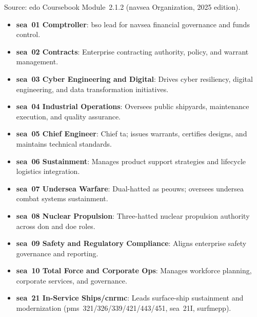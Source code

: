\documentclass[../main.tex]{subfiles}
\begin{document}
\begin{description}[style=nextline, labelsep=0.5em, font=\bfseries]
  \item[\textbf{\ac{navsea} headquarters roles.}]
        Source: \ac{edo} Coursebook Module~2.1.2 (\ac{navsea} Organization, 2025 edition).
        \begin{itemize}
          \item \textbf{\ac{sea}~01 Comptroller}: \ac{bso} lead for \ac{navsea} financial governance and funds control.
          \item \textbf{\ac{sea}~02 Contracts}: Enterprise contracting authority, policy, and warrant management.
          \item \textbf{\ac{sea}~03 Cyber Engineering and Digital}: Drives cyber resiliency, digital engineering, and data transformation initiatives.
          \item \textbf{\ac{sea}~04 Industrial Operations}: Oversees public shipyards, maintenance execution, and quality assurance.
          \item \textbf{\ac{sea}~05 Chief Engineer}: Chief \ac{ta}; issues warrants, certifies designs, and maintains technical standards.
          \item \textbf{\ac{sea}~06 Sustainment}: Manages product support strategies and lifecycle logistics integration.
          \item \textbf{\ac{sea}~07 Undersea Warfare}: Dual-hatted as \ac{peouws}; oversees undersea combat systems sustainment.
          \item \textbf{\ac{sea}~08 Nuclear Propulsion}: Three-hatted nuclear propulsion authority across \ac{don} and \ac{doe} roles.
          \item \textbf{\ac{sea}~09 Safety and Regulatory Compliance}: Aligns enterprise safety governance and reporting.
          \item \textbf{\ac{sea}~10 Total Force and Corporate Ops}: Manages workforce planning, corporate services, and governance.
          \item \textbf{\ac{sea}~21 In-Service Ships/\ac{cnrmc}}: Leads surface-ship sustainment and modernization (\ac{pms}~321/326/339/421/443/451, \ac{sea}~21I, \ac{surfmepp}).
        \end{itemize}


\end{description}
\end{document}
